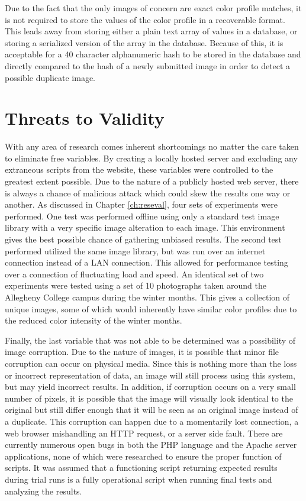 Due to the fact that the only images of concern are exact color profile matches, it is not required to store the values of the color profile in a recoverable format. This leads away from storing either a plain text array of values in a database, or storing a serialized version of the array in the database. Because of this, it is acceptable for a 40 character alphanumeric hash to be stored in the database and directly compared to the hash of a newly submitted image in order to detect a possible duplicate image.

\section{Threats to Validity}  \label{sec:threats}
With any area of research comes inherent shortcomings no matter the care taken to eliminate free variables. By creating a locally hosted server and excluding any extraneous scripts from the website, these variables were controlled to the greatest extent possible. Due to the nature of a publicly hosted web server, there is always a chance of malicious attack which could skew the results one way or another. As discussed in Chapter \ref{ch:reseval}, four sets of experiments were performed. One test was performed offline using only a standard test image library with a very specific image alteration to each image. This environment gives the best possible chance of gathering unbiased results. The second test performed utilized the same image library, but was run over an internet connection instead of a LAN connection. This allowed for performance testing over a connection of fluctuating load and speed. An identical set of two experiments were tested using a set of 10 photographs taken around the Allegheny College campus during the winter months. This gives a collection of unique images, some of which would inherently have similar color profiles due to the reduced color intensity of the winter months.

Finally, the last variable that was not able to be determined was a possibility of image corruption. Due to the nature of images, it is possible that minor file corruption can occur on physical media. Since this is nothing more than the loss or incorrect representation of data, an image will still process using this system, but may yield incorrect results. In addition, if corruption occurs on a very small number of pixels, it is possible that the image will visually look identical to the original but still differ enough that it will be seen as an original image instead of a duplicate. This corruption can happen due to a momentarily lost connection, a web browser mishandling an HTTP request, or a server side fault. There are currently numerous open bugs in both the PHP language and the Apache server applications, none of which were researched to ensure the proper function of scripts. It was assumed that a functioning script returning expected results during trial runs is a fully operational script when running final tests and analyzing the results.